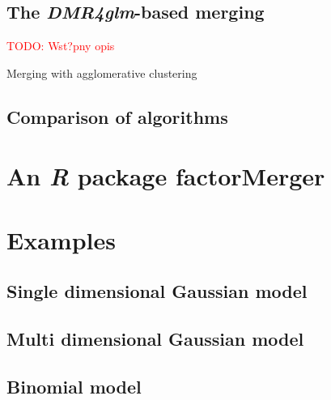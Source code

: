 \documentclass[12pt]{article}
\newcommand{\todo}{\textcolor{red}}
\begin{document}
\subsection{The \emph{DMR4glm}-based merging}

\todo{TODO: Wst?pny opis}

\begin{algorithm}[H]
\caption{Merging with agglomerative clustering}
\begin{algorithmic}[2]

\EndFor
        
\Else 
{}
\EndIf
    \EndFunction
\end{algorithmic}
\end{algorithm}

\subsection{Comparison of algorithms}
\label{subsec:comp}

\section{An \emph{R} package factorMerger}
\label{sec:package}

\section{Examples}
\label{sec:examples}

\subsection{Single dimensional Gaussian model}
\label{subsec:sgauss}

\subsection{Multi dimensional Gaussian model}
\label{subsec:mgauss}

\subsection{Binomial model}
\label{subsec:binom}
\end{document}
